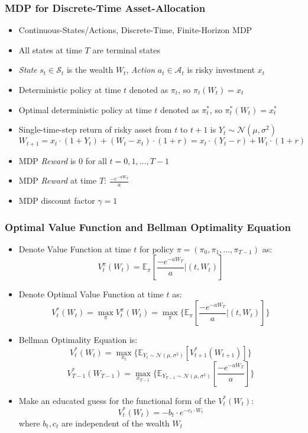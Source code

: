\documentclass[handout]{beamer}
\begin{document}
\begin{frame}
\frametitle{MDP for Discrete-Time Asset-Allocation}
\pause
\begin{itemize}[<+->]
\item Continuous-States/Actions, Discrete-Time, Finite-Horizon MDP
\item All states at time $T$ are terminal states
\item {\em State} $s_t \in \mathcal{S}_t$ is the wealth $W_t$, {\em Action} $a_t \in \mathcal{A}_t$ is risky investment $x_t$
\item  Deterministic policy at time $t$ denoted as $\pi_t$, so $\pi_t(W_t) = x_t$
\item Optimal deterministic policy at time $t$ denoted as $\pi^*_t$, so $\pi^*_t(W_t) = x^*_t$
\item Single-time-step return of risky asset from $t$ to $t+1$ is $Y_t \sim \mathcal{N}(\mu, \sigma^2)$
$$W_{t+1} = x_t \cdot (1 + Y_t) + (W_t - x_t) \cdot (1 + r) = x_t \cdot (Y_t - r) + W_t \cdot (1 + r)$$
\item MDP {\em Reward} is 0 for all $t = 0, 1, \ldots, T-1$
\item MDP {\em Reward} at time $T$: $\frac {- e^{-a W_T}} {a}$
\item MDP discount factor $\gamma = 1$
\end{itemize}
\end{frame}

\begin{frame}
\frametitle{Optimal Value Function and Bellman Optimality Equation}
\pause
\begin{itemize}[<+->]
\item Denote Value Function at time $t$ for policy $\pi = (\pi_0, \pi_1, \ldots, \pi_{T-1})$ as:
$$V^{\pi}_t(W_t) = \mathbb{E}_{\pi}[\frac {- e^{-a W_T}} a | (t, W_t)]$$
\item Denote Optimal Value Function at time $t$ as:
$$V^*_t(W_t) = \max_{\pi} V^{\pi}_t(W_t) = \max_{\pi} \{ \mathbb{E}_{\pi}[\frac {- e^{-a W_T}} a | (t, W_t)] \}$$
\item Bellman Optimality Equation is:
$$V^*_t(W_t) = \max_{x_t} \{\mathbb{E}_{Y_t \sim \mathcal{N}(\mu, \sigma^2)}[V^*_{t+1}(W_{t+1})]\}$$
$$V^*_{T-1}(W_{T-1}) = \max_{x_{T-1}} \{ \mathbb{E}_{Y_{T-1} \sim \mathcal{N}(\mu, \sigma^2)}[\frac {- e^{-a W_T}} a] \}$$
\item Make an educated guess for the functional form of the $V^*_t(W_t)$:
$$V^*_t(W_t) = - b_t \cdot e^{-c_t \cdot W_t}$$
where $b_t, c_t$ are independent of the wealth $W_t$
\end{itemize}
\end{frame}
\end{document}
